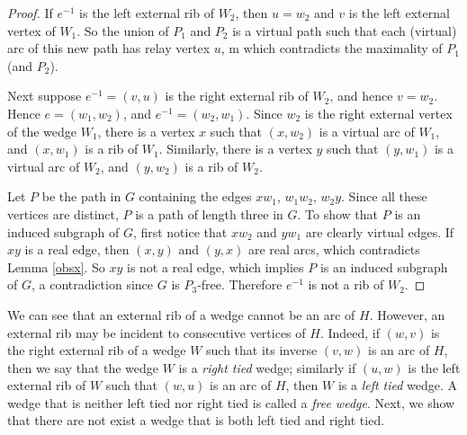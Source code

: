 \documentclass[12pt,letterpaper,oneside]{book}
\begin{document}
\begin{proof}
If $e^{-1}$ is 
the left external rib of $W_2$, then $u=w_2$ and $v$ is the left external vertex of $W_1$.    
So the union of $P_1$ and $P_2$ is a 
virtual path such that each (virtual) arc of this new 
path has relay vertex $u$, m
which contradicts the maximality of $P_1$ (and $P_2$).  

Next suppose $e^{-1}=(v,u)$ is the right external rib of $W_2$, and hence 
$v=w_2$.  Hence $e=(w_1,w_2)$, and $e^{-1}=(w_2,w_1)$.  Since $w_2$ is the right external vertex of the wedge $W_1$, there is a 
vertex $x$ such that $(x,w_2)$ is a virtual arc of $W_1$, and $(x,w_1)$ is a rib of $W_1$.  Similarly, there is a vertex $y$ 
such that $(y,w_1)$ is a virtual arc of $W_2$, and $(y,w_2)$ is a rib of $W_2$.  

Let $P$ be the path in $G$ containing 
the edges $xw_1$, $w_1w_2$, $w_2y$.  Since all these vertices are distinct, $P$ is a path of length three in $G$.  To show that $P$ is 
an induced subgraph of $G$, first notice that $xw_2$ and $yw_1$ are clearly virtual edges.  If $xy$ is a real edge, then $(x,y)$ and $(y,x)$ are 
real arcs, which contradicts Lemma \ref{obsx}.  So $xy$ is not a real edge, which implies $P$ is an induced subgraph of $G$, a contradiction 
since $G$ is $P_3$-free.  Therefore $e^{-1}$ is not a rib of $W_2$.  %
\end{proof}


We can see that an external 
rib of a wedge cannot be an arc of $H$.  However, an external rib may be incident to consecutive vertices of $H$.  
Indeed, if $(w,v)$ is the right external rib of a wedge $W$ such that its inverse $(v,w)$ is an arc of $H$, 
then we say that the wedge $W$ is a \emph{right tied} wedge; similarly  
if $(u,w)$ is the left external rib of $W$ such that $(w,u)$ is an arc of $H$, then $W$ is a \emph{left tied} wedge.  
A wedge that is neither left tied nor right tied is called a \emph{free wedge}.   
Next, we show that there are not exist a  
wedge that is both left tied and right tied.  
\end{document}
